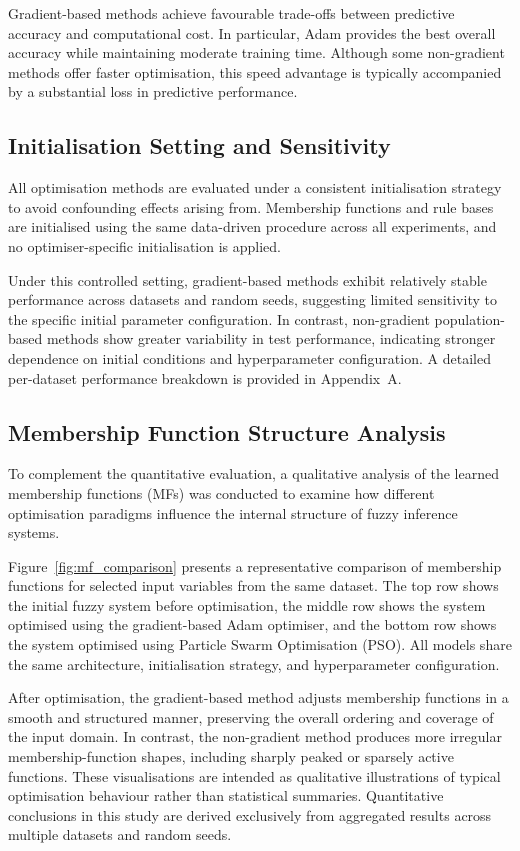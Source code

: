 \documentclass[a4paper,12pt,oneside]{article}
\begin{document}
Gradient-based methods achieve favourable trade-offs between predictive accuracy and computational cost. In particular, Adam provides the best overall accuracy while maintaining moderate training time. Although some non-gradient methods offer faster optimisation, this speed advantage is typically accompanied by a substantial loss in predictive performance.

\subsection{Initialisation Setting and Sensitivity}

All optimisation methods are evaluated under a consistent initialisation strategy to avoid confounding effects arising from. Membership functions and rule bases are initialised using the same data-driven procedure across all experiments, and no optimiser-specific initialisation is applied.

Under this controlled setting, gradient-based methods exhibit relatively stable performance across datasets and random seeds, suggesting limited sensitivity to the specific initial parameter configuration. In contrast, non-gradient population-based methods show greater variability in test performance, indicating stronger dependence on initial conditions and hyperparameter configuration. A detailed per-dataset performance breakdown is provided in Appendix~A.

\subsection{Membership Function Structure Analysis}

To complement the quantitative evaluation, a qualitative analysis of the learned membership functions (MFs) was conducted to examine how different optimisation paradigms influence the internal structure of fuzzy inference systems.

Figure~\ref{fig:mf_comparison} presents a representative comparison of membership functions for selected input variables from the same dataset. The top row shows the initial fuzzy system before optimisation, the middle row shows the system optimised using the gradient-based Adam optimiser, and the bottom row shows the system optimised using Particle Swarm Optimisation (PSO). All models share the same architecture, initialisation strategy, and hyperparameter configuration.

After optimisation, the gradient-based method adjusts membership functions in a smooth and structured manner, preserving the overall ordering and coverage of the input domain. In contrast, the non-gradient method produces more irregular membership-function shapes, including sharply peaked or sparsely active functions. These visualisations are intended as qualitative illustrations of typical optimisation behaviour rather than statistical summaries. Quantitative conclusions in this study are derived exclusively from aggregated results across multiple datasets and random seeds.
\end{document}
